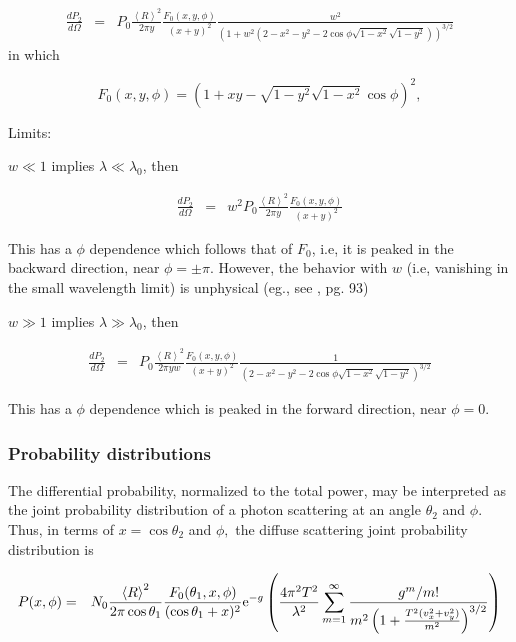 \documentclass[11pt,openany]{report}
\newcommand{\der}[2]{\frac{d {#1}}{d {#2}}}
\newcommand{\e}{{\rm e}}
\begin{document}
{{\begin{eqnarray}
\der{P_{2}}{\Omega}&=&
P_{0}\frac{\left<R\right>^{2}}{2\pi y}\frac{F_{0}(x,y,\phi)}{(x+y)^{2}}\frac{w^{2}}{\left(1+w^{2}\left(2-x^{2}-y^{2}-2\cos\phi\sqrt{1-x^{2}}\sqrt{1-y^{2}}\right)\right)^{3/2}}
\end{eqnarray}
in which

$$F_{0}(x,y,\phi)=\left(1+xy-\sqrt{1-y^{2}}\sqrt{1-x^{2}}\cos\phi\right)^{2},$$

Limits: 

$w\ll1$ implies $\lambda \ll \lambda_{0}$, then

\begin{eqnarray}
\der{P_{2}}{\Omega}&=&w^{2}
P_{0}\frac{\left<R\right>^{2}}{2\pi y}\frac{F_{0}(x,y,\phi)}{(x+y)^{2}}\end{eqnarray}

This has a $\phi$ dependence which follows that of $F_{0}$, i.e, it is peaked in the backward direction, near $\phi=\pm\pi$. However, the behavior with $w$ (i.e, vanishing in the small wavelength limit) is unphysical (eg., see \cite{b:ogilvy}, pg. 93)

$w\gg1$ implies $\lambda \gg \lambda_{0}$, then

\begin{eqnarray}
\der{P_{2}}{\Omega}&=&
P_{0}\frac{\left<R\right>^{2}}{2\pi y w}\frac{F_{0}(x,y,\phi)}{(x+y)^{2}}\frac{1}{\left(2-x^{2}-y^{2}-2\cos\phi\sqrt{1-x^{2}}\sqrt{1-y^{2}}\right)^{3/2}}\end{eqnarray}


This has a $\phi$ dependence which is peaked in the forward direction, near $\phi=0$.

\subsubsection{Probability distributions}

The differential probability, normalized to the total power, may be interpreted as the joint probability distribution of a photon scattering at an angle $\theta_{2}$ and $\phi$.  Thus, in terms of $x=\cos\theta_{2}$ and $\phi,$ the diffuse scattering joint probability distribution is

\begin{eqnarray}
P(x,\phi)&=&N_{0}\frac{\left<R\right>^{2}}{2\pi\cos\theta_{1}}\frac{F_{0}(\theta_{1},x,\phi)}{(\cos{\theta_{1}}+x)^{2}}
\e^{-g}\left(\frac{4\pi^{2}T^{2}}{\lambda^{2}}\sum_{m=1}^{\infty}\frac{g^{m}/m!}{m^{2}\left(1+\frac{T^{2}(v_{x}^{2}+v_{y}^{2})}{m^{2}}\right)^{3/2}}\right)\end{eqnarray}

}}
\end{document}
